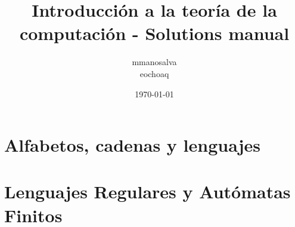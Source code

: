 \documentclass[12pt,a4paper]{report}
\title{Introducción a la teoría de la computación - Solutions manual}
\author{mmanosalva\\eochoaq}
\date{\today}
\begin{document}
\setlength{\parindent}{0pt}
\maketitle
\tableofcontents
\cleardoublepage

\chapter{Alfabetos, cadenas y lenguajes}

\chapter{Lenguajes Regulares y Autómatas Finitos}

\end{document}
